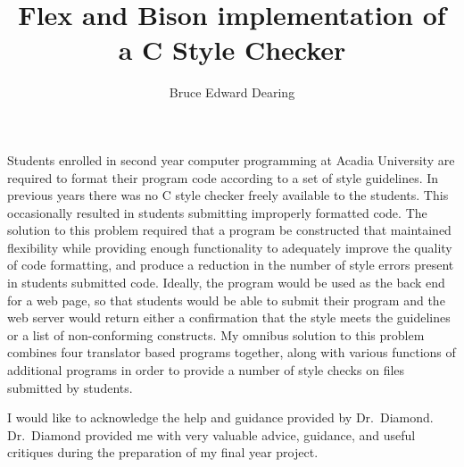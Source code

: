 

\title{Flex and Bison implementation of a C Style Checker}
\author{Bruce Edward Dearing}

\beforepreface
{}

\medskip

Students enrolled in second year computer programming at Acadia 
University are required to format their program code according to a set of 
style guidelines. In previous years there was no C style checker freely 
available to the students. This occasionally resulted in students submitting 
improperly formatted code. The solution to this problem required that a program 
be constructed that maintained flexibility while providing enough functionality
to adequately improve the quality of code formatting, and produce a reduction 
in the number of style errors present in students submitted code. Ideally, 
the program would be used as the back end for a web page, so that students
would be able to submit their program and the web server would return either 
a confirmation that the style meets the guidelines or a list of non-conforming 
constructs. My omnibus solution to this problem combines four translator based
programs together, along with various functions of additional programs in order 
to provide a number of style checks on files submitted by students.
\newpage
    

I would like to acknowledge the help and guidance provided by Dr.~Diamond.\\
Dr.~Diamond provided me with very valuable advice, guidance, and useful 
critiques during the preparation of my final year project.
\afterpreface
